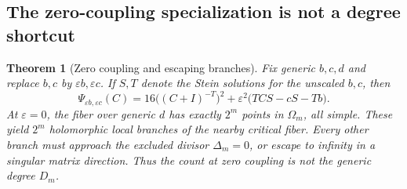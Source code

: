 \documentclass[11pt]{article}
\newtheorem{theorem}{Theorem}[section]
\theoremstyle{remark}\newtheorem{remark}[theorem]{Remark}
\begin{document}
\subsection{The zero-coupling specialization is not a degree shortcut}
\begin{theorem}[Zero coupling and escaping branches]\label{thm:zero-coupling}
Fix generic $b,c,d$ and replace $b,c$ by $\varepsilon b,\varepsilon c$. If $S,T$ denote the Stein solutions for the unscaled $b,c$, then
\begin{equation}\label{eq:coupling}
\Psi_{\varepsilon b,\varepsilon c}(C)
=16\bigl((C+I)^{-T}\bigr)^2+
\varepsilon^2\bigl(TCS-cS-Tb\bigr).
\end{equation}
At $\varepsilon=0$, the fiber over generic $d$ has exactly $2^m$ points in $\Omega_m$, all simple. These yield $2^m$ holomorphic local branches of the nearby critical fiber. Every other branch must approach the excluded divisor $\Delta_m=0$, or escape to infinity in a singular matrix direction. Thus the count at zero coupling is not the generic degree $D_m$.
\end{theorem}
\end{document}
